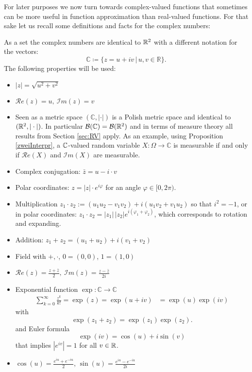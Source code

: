 For later purposes we now turn towards complex-valued functions that sometimes can be more useful in function approximation than real-valued functions. For that sake let us recall some definitions and facts for the complex numbers:
\begin{lreminder}
  As a set the complex numbers are identical to $\mathbb{R}^2$ with a different notation for the vectors: $$\mathbb{C}\coloneqq \{ z = u+iv \,|\, u,v\in\mathbb{R} \}.$$ The following properties will be used:
	\begin{itemize}
		\item $\lvert z \rvert = \sqrt{u^2 + v^2}$
		\item $\mathcal{R}e(z) = u, \: \mathcal{I}m(z) = v$
		\item Seen as a metric space $( \mathbb{C}, |\cdot| )$ is a Polish metric space and identical to $(\mathbb{R}^2,|\cdot|)$. In particular $\mathcal B(\mathbb{C})=\mathcal B(\mathbb{R}^2)$ and in terms of measure theory all results from Section \ref{sec:RV} apply. As an example, using Proposition \ref{zweiInterpr}, a $\mathbb{C}$-valued random variable $X\colon \Omega \to \mathbb{C}$ is measurable if and only if $\mathcal{R}e(X)$ and $\mathcal{I}m(X)$ are measurable.
				\item Complex conjugation: $\bar{z} = u - i \cdot v$
		\item Polar coordinates: $z = \lvert z \rvert \cdot e^{i \varphi}$ for an angle $\varphi\in [0,2\pi)$.
		\item Multiplication $z_1\cdot z_2:= (u_1u_2-v_1v_2)+i(u_1v_2+v_1u_2)$ so that $i^2=-1$, or in polar coordinates: $z_1 \cdot z_2 = \lvert z_1 \rvert \, \lvert z_2 \rvert e^{i(\varphi_1 + \varphi_2)}$, which corresponds to rotation and expanding.
		\item Addition: $z_1 + z_2 = (u_1+u_2)+i(v_1+v_2)$
		\item Field with $+,\cdot$, $0=(0,0)$, $1=(1,0)$
		\item $\mathcal{R}e(z) = \frac{z+ \bar{z}}{2},\: \mathcal{I}m(z) = \frac{z-\bar{z}}{2i}$
		\item Exponential function $\exp\colon \mathbb{C} \to \mathbb{C}$ 
			\begin{align*}
				\sum_{k=0}^{\infty} \frac{z^k}{k!}=\exp(z) = \exp(u+iv) &= \exp(u)\exp(iv)
			\end{align*}
			with
			$$\exp(z_1 + z_2) = \exp(z_1)\exp(z_2).$$
			and Euler formula
			$$\exp(iv)=\cos(u)+i \sin(v)$$
			that implies $|e^{iv}|=1$ for all $v\in\mathbb{R}$.
		\item $\cos(u) = \frac{e^{iu}+ e^{-iu}}{2}$, $\sin(u) =  \frac{e^{iu} - e^{-iu}}{2i}$
	\end{itemize}
\end{lreminder}
